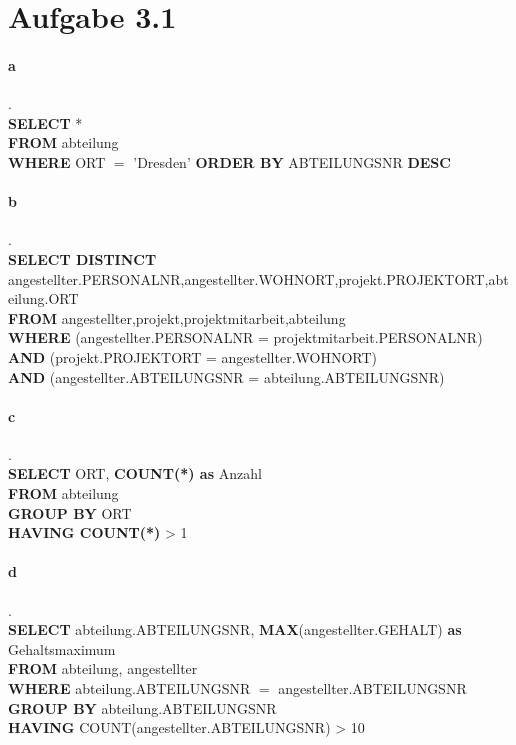 \documentclass{article}
\begin{document}
	
	
	
	
	
	
	\section*{Aufgabe 3.1}
		\paragraph*{a}.\\
			\textbf{SELECT} *\\
			\textbf{FROM} abteilung\\
			\textbf{WHERE} ORT $=$ 'Dresden'
			\textbf{ORDER BY} ABTEILUNGSNR \textbf{DESC}
			
		\paragraph*{b}.\\
			\textbf{SELECT DISTINCT} angestellter.PERSONALNR,angestellter.WOHNORT,projekt.PROJEKTORT,abteilung.ORT\\
			\textbf{FROM} angestellter,projekt,projektmitarbeit,abteilung\\
			\textbf{WHERE} (angestellter.PERSONALNR = projektmitarbeit.PERSONALNR) \textbf{AND} (projekt.PROJEKTORT = angestellter.WOHNORT)\\ \textbf{AND} (angestellter.ABTEILUNGSNR = abteilung.ABTEILUNGSNR)
			
		\paragraph*{c}.\\
			\textbf{SELECT} ORT, \textbf{COUNT(*) as} Anzahl\\
			\textbf{FROM} abteilung\\
			\textbf{GROUP BY} ORT\\
			\textbf{HAVING COUNT(*)} > 1
			
		\paragraph*{d}.\\
			\textbf{SELECT} abteilung.ABTEILUNGSNR, \textbf{MAX}(angestellter.GEHALT) \textbf{as} Gehaltsmaximum\\
			\textbf{FROM} abteilung, angestellter\\
			\textbf{WHERE} abteilung.ABTEILUNGSNR $ = $ angestellter.ABTEILUNGSNR\\
			\textbf{GROUP BY} abteilung.ABTEILUNGSNR\\
			\textbf{HAVING} COUNT(angestellter.ABTEILUNGSNR) > 10
			
\end{document}
